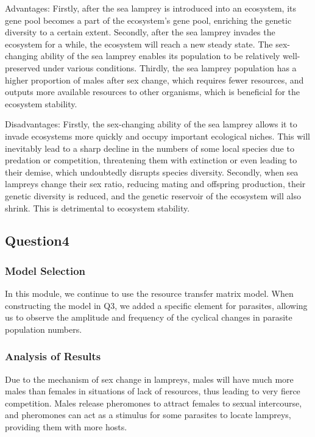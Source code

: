 \documentclass[12pt]{article}
\begin{document}
Advantages: Firstly, after the sea lamprey is introduced into an ecosystem, its gene pool becomes
a part of the ecosystem's gene pool, enriching the genetic diversity to a certain extent.
Secondly, after the sea lamprey invades the ecosystem for a while, the ecosystem will reach
a new steady state. The sex-changing ability of the sea lamprey enables its population to
be relatively well-preserved under various conditions. Thirdly, the sea lamprey population
has a higher proportion of males after sex change, which requires fewer resources, and
outputs more available resources to other organisms, which is beneficial for the ecosystem stability.

Disadvantages: Firstly, the sex-changing ability of the sea lamprey allows it to invade ecosystems
more quickly and occupy important ecological niches. This will inevitably lead to a sharp decline
in the numbers of some local species due to predation or competition, threatening them with
extinction or even leading to their demise, which undoubtedly disrupts species diversity.
Secondly, when sea lampreys change their sex ratio, reducing mating and offspring production,
their genetic diversity is reduced, and the genetic reservoir of the ecosystem will also shrink.
This is detrimental to ecosystem stability.

\subsection{Question4}
\subsubsection{Model Selection}

In this module, we continue to use the resource transfer matrix model. When constructing the model
in Q3, we added a specific element for parasites, allowing us to observe the amplitude and frequency
of the cyclical changes in parasite population numbers.

\subsubsection{Analysis of Results}

Due to the mechanism of sex change in lampreys, males will have much more males than females in
situations of lack of resources, thus leading to very fierce competition. Males release pheromones
to attract females to sexual intercourse, and pheromones can act as a stimulus for some parasites
to locate lampreys, providing them with more hosts.
\end{document}
